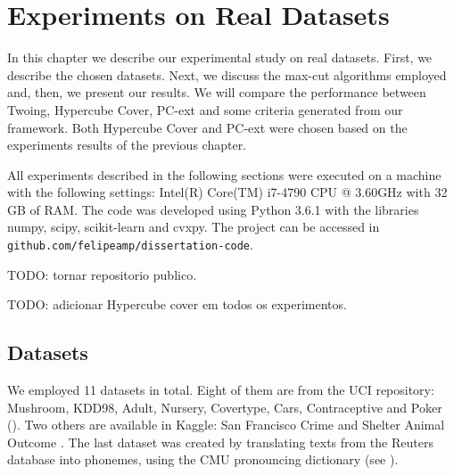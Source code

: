\newpage

\chapter{Experiments on Real Datasets}
\label{chap:experiments-datasets}


In this chapter we describe our experimental study on real datasets. First, we describe the chosen datasets. Next, we discuss the max-cut algorithms 
employed and, then, we present our results. We will compare the performance between Twoing, Hypercube Cover, PC-ext and some criteria generated from our framework. Both Hypercube Cover and PC-ext were chosen based on the experiments results of the previous chapter.

All  experiments described in the following sections were executed on a machine with the following settings: Intel(R) Core(TM) i7-4790 CPU @ 3.60GHz with 32 GB of RAM. The code was developed using Python 3.6.1 with the libraries numpy, scipy, scikit-learn and cvxpy.
The project can be accessed in {\tt github.com/felipeamp/dissertation-code}.

TODO: tornar repositorio publico.

TODO: adicionar Hypercube cover em todos os experimentos.

\section{Datasets}
We employed 11 datasets in total. Eight of them are from the UCI repository:
Mushroom, KDD98, Adult, Nursery, Covertype, Cars, Contraceptive and Poker (\cite{Lichman:2013}).
Two others are available in Kaggle: San Francisco Crime and Shelter Animal Outcome
\cite{SFC,AnimalShelter}. The last dataset was created by translating texts from the Reuters database \cite{Lichman:2013} into phonemes, using the CMU pronouncing dictionary (see \cite{CMU-PD}).

